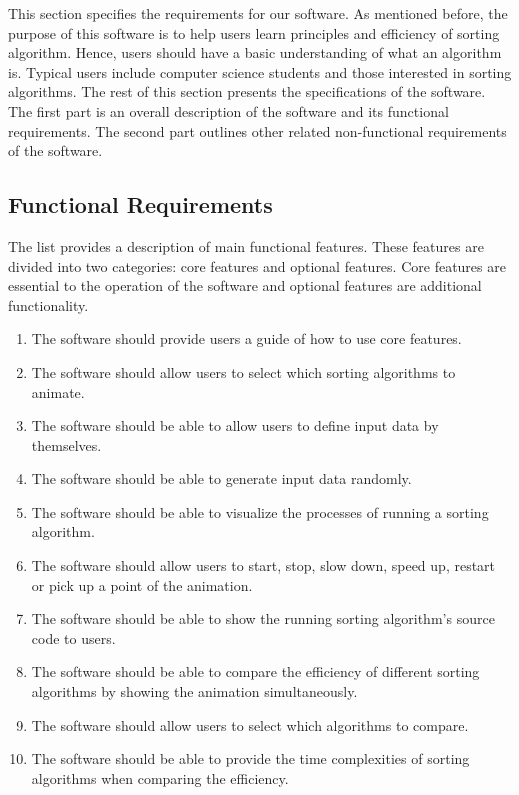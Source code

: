 \documentclass[paper=a4, fontsize=11pt,twoside]{scrartcl}		%
\begin{document}
This section specifies the requirements for our software. As mentioned before, the purpose of this software is to help users learn principles and efficiency of sorting algorithm. Hence, users should have a basic understanding of what an algorithm is. Typical users include computer science students and those interested in sorting algorithms. The rest of this section presents the specifications of the software. The first part is an overall description of the software and its functional requirements. The second part outlines other related non-functional requirements of the software.   

\subsection{Functional Requirements}

The list provides a description of main functional features. These features are divided into two categories: core features and optional features. Core features are essential to the operation of the software and optional features are additional functionality.\\


\begin{enumerate}
\item The software should provide users a guide of how to use core features.  

\item The software should allow users to select which sorting algorithms to animate.

\item The software should be able to allow users to define input data by themselves.

\item The software should be able to generate input data randomly.
                                                    
\item The software should be able to visualize the processes of running a sorting algorithm. 

\item The software should allow users to start, stop, slow down, speed up, restart or pick up a point of the animation.

\item The software should be able to show the running sorting algorithm's source code to users.

\item The software should be able to compare the efficiency of different sorting algorithms by  showing the animation simultaneously.

\item The software should allow users to select which algorithms to compare.

\item The software should be able to provide the time complexities of sorting algorithms when comparing the efficiency.


\end{enumerate}
\end{document}
